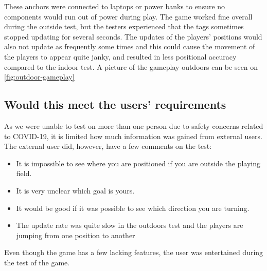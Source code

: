 These anchors were connected to laptops or power banks to ensure no components would run out of power during play.
The game worked fine overall during the outside test, but the testers experienced that the tags sometimes stopped updating for several seconds.
The updates of the players' positions would also not update as frequently some times and this could cause the movement of the players to appear quite janky, and resulted in less positional accuracy compared to the indoor test.
A picture of the gameplay outdoors can be seen on \autoref{fig:outdoor-gameplay}

\subsection{Would this meet the users' requirements}
As we were unable to test on more than one person due to safety concerns related to COVID-19, it is limited how much information was gained from external users.
The external user did, however, have a few comments on the test:

\begin{itemize}
    \item It is impossible to see where you are positioned if you are outside the playing field.
    \item It is very unclear which goal is yours.
    \item It would be good if it was possible to see which direction you are turning.
    \item The update rate was quite slow in the outdoors test and the players are jumping from one position to another
\end{itemize}
Even though the game has a few lacking features, the user was entertained during the test of the game.


